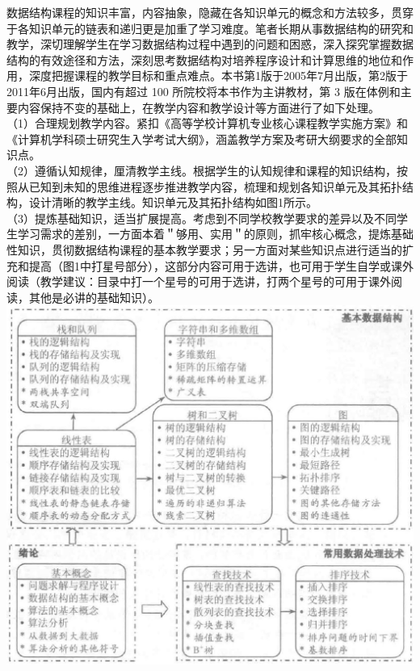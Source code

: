\documentclass[10pt]{article}
\begin{document}
数据结构课程的知识丰富，内容抽象，隐藏在各知识单元的概念和方法较多，贯穿于各知识单元的链表和递归更是加重了学习难度。笔者长期从事数据结构的研究和教学，深切理解学生在学习数据结构过程中遇到的问题和困惑，深入探究掌握数据结构的有效途径和方法，深刻思考数据结构对培养程序设计和计算思维的地位和作用，深度把握课程的教学目标和重点难点。本书第1版于2005年7月出版，第2版于2011年6月出版，国内有超过 100 所院校将本书作为主讲教材，第 3 版在体例和主要内容保持不变的基础上，在教学内容和教学设计等方面进行了如下处理。\\
（1）合理规划教学内容。紧扣《高等学校计算机专业核心课程教学实施方案》和《计算机学科硕士研究生入学考试大纲》，涵盖教学方案及考研大纲要求的全部知识点。\\
（2）遵循认知规律，厘清教学主线。根据学生的认知规律和课程的知识结构，按照从已知到未知的思维进程逐步推进教学内容，梳理和规划各知识单元及其拓扑结构，设计清晰的教学主线。知识单元及其拓扑结构如图1所示。\\
（3）提炼基础知识，适当扩展提高。考虑到不同学校教学要求的差异以及不同学生学习需求的差别，一方面本着＂够用、实用＂的原则，抓牢核心概念，提炼基础性知识，贯彻数据结构课程的基本教学要求；另一方面对某些知识点进行适当的扩充和提高（图1中打星号部分），这部分内容可用于选讲，也可用于学生自学或课外阅读（教学建议：目录中打一个星号的可用于选讲，打两个星号的可用于课外阅读，其他是必讲的基础知识）。\\
\includegraphics[max width=\textwidth, center]{2025_06_06_704745ea57b15b2333e5g-006}
\end{document}
